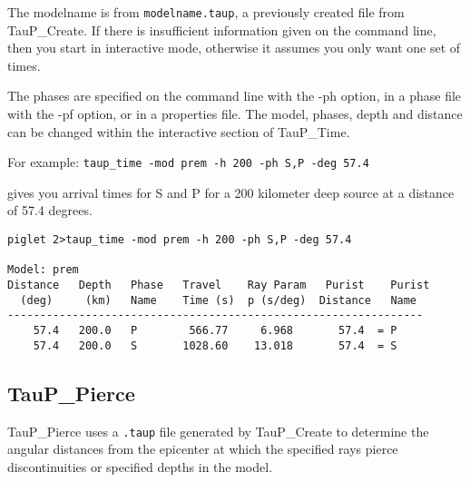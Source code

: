 The modelname is from \texttt{modelname.taup}, a previously created file 
from TauP\_Create. 
If there is insufficient information given on the command line, then you start
in interactive mode, otherwise it assumes you only want one set of times.

The phases are specified on the command line with the -ph option,
in a phase file with the -pf option, or in a properties file.
The model, phases, depth and distance can be changed within the interactive
section of TauP\_Time.

For example: \texttt{taup\_time -mod prem -h 200 -ph S,P -deg 57.4}

gives you arrival times for S and P for a 200 kilometer
deep source at a distance of 57.4 degrees.
\begin{verbatim}
piglet 2>taup_time -mod prem -h 200 -ph S,P -deg 57.4

Model: prem
Distance   Depth   Phase   Travel    Ray Param   Purist    Purist
  (deg)     (km)   Name    Time (s)  p (s/deg)  Distance   Name
----------------------------------------------------------------
    57.4   200.0   P        566.77     6.968       57.4  = P    
    57.4   200.0   S       1028.60    13.018       57.4  = S
\end{verbatim}

\subsection{TauP\_Pierce}

TauP\_Pierce uses a \texttt{.taup} file generated by 
TauP\_Create to determine the
angular distances from the epicenter at which the specified rays pierce 
discontinuities or specified depths in the model.


